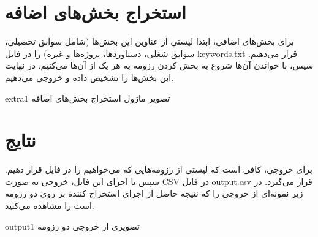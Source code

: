 \documentclass{article}
\begin{document}
	\section{استخراج بخش‌های اضافه}

برای بخش‌های اضافی، ابتدا لیستی از عناوین  این بخش‌ها (شامل سوابق تحصیلی، سوابق شغلی، دستاوردها، پروژه‌ها و غیره) را در فایل keywords.txt قرار می‌دهیم. سپس، با خواندن آن‌ها شروع به بخش کردن رزومه به هر یک از آن‌ها می‌کنیم. در نهایت این بخش‌ها را تشخیص داده و خروجی می‌دهیم.



	\begin{image}{0.4}{extra}{1}
	تصویر ماژول استخراج بخش‌های اضافه
	\end{image}

	\section{نتایج}
	
	برای خروجی، کافی است که لیستی از رزومه‌هایی که می‌خواهیم را در فایل  قرار دهیم. سپس با اجرای این فایل، خروجی به صورت CSV در فایل output.csv قرار می‌گیرد. در زیر نمونه‌ای از خروجی را که نتیجه حاصل از اجرای استخراج کننده بر روی دو رزومه است را مشاهده می‌کنید.
	
	
	
	
	\begin{image}{0.3}{output}{1}
		تصویری از خروجی دو رزومه
	\end{image}
	
\end{document}
